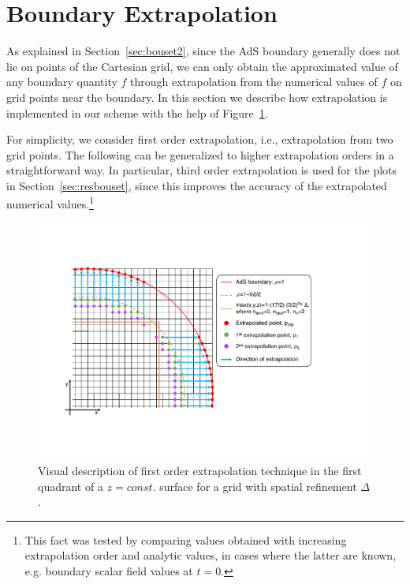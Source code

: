 \documentclass[aps,letterpaper,twocolumn,nofootinbib]{revtex4}
\numberwithin{equation}{section}
\begin{document}
\section{Boundary Extrapolation}\label{sec:extrapconvbdy}

As explained in Section~\ref{sec:bouset2}, since the AdS boundary generally does not lie on points of the Cartesian grid, we can only obtain the approximated value of any boundary quantity $f$ through extrapolation from the numerical values of $f$ on grid points near the boundary. In this section we describe how extrapolation is implemented in our scheme with the help of Figure~\ref{fig:lego_circle}. 

For simplicity, we consider first order extrapolation, i.e., extrapolation from two grid points. The following can be generalized to higher extrapolation orders in a straightforward way. In particular, third order extrapolation is used for the plots in Section~\ref{sec:resbouset}, since this improves the accuracy of the extrapolated numerical values.\footnote{This fact was tested by comparing values obtained with increasing extrapolation order and analytic values, in cases where the latter are known, e.g. boundary scalar field values at $t=0$.}

\begin{figure}[t!]
        \centering
        \includegraphics[width=6.1in,clip=true]{Lego_circle_new.pdf}
\parbox{5.0in}{\caption{Visual description of first order extrapolation technique in the first quadrant of a $z=const.$ surface for a grid with spatial refinement $\Delta$.
        }\label{fig:lego_circle}}
\end{figure}
\end{document}
